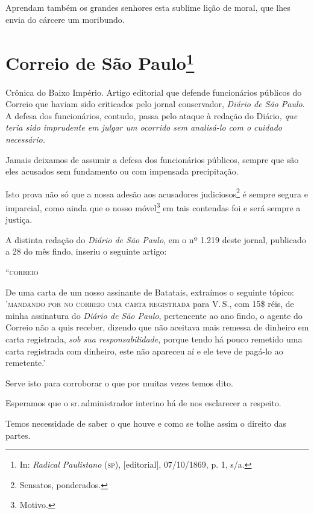 \noindent\dotfill

Aprendam também os grandes senhores esta sublime lição de moral, que
lhes envia do cárcere um moribundo.

\chapter{Correio de São Paulo\footnote{In: \emph{Radical Paulistano} (\textsc{sp}),
  {[}editorial{]}, 07/10/1869, p. 1, s/a.}}

\begin{didascalia}
Crônica do Baixo Império. Artigo editorial que defende funcionários
públicos do Correio que haviam sido criticados pelo jornal
conservador,\emph{ Diário de São Paulo}. A defesa dos funcionários,
contudo, passa pelo ataque à redação do Diário\emph{, que teria sido
imprudente em julgar um ocorrido sem analisá-lo com o cuidado
necessário.}
\end{didascalia}



Jamais deixamos de assumir a defesa dos funcionários públicos, sempre
que são eles acusados sem fundamento ou com impensada precipitação.

Isto prova não só que a nossa adesão aos acusadores
judiciosos\footnote{Sensatos, ponderados.} é sempre segura e
imparcial, como ainda que o nosso móvel\footnote{Motivo.} em tais
contendas foi e será sempre a justiça.

A distinta redação do \emph{Diário de São Paulo}, em o nº 1.219 deste
jornal, publicado a 28 do mês findo, inseriu o seguinte artigo:

``\textsc{correio}

De uma carta de um nosso assinante de Batatais, extraímos o seguinte
tópico: '\textsc{mandando por no correio uma carta registrada} para V.\,S., com
15\$ réis, de minha assinatura do \emph{Diário de São Paulo}, pertencente
ao ano findo, o agente do Correio não a quis receber, dizendo que não
aceitava mais remessa de dinheiro em carta registrada, \emph{sob sua
responsabilidade}, porque tendo há pouco remetido uma carta registrada
com dinheiro, este não apareceu aí e ele teve de pagá-lo ao remetente.'

Serve isto para corroborar o que por muitas vezes temos dito.

Esperamos que o sr.\,administrador interino há de nos esclarecer a
respeito.

Temos necessidade de saber o que houve e como se tolhe assim o direito
das partes.

